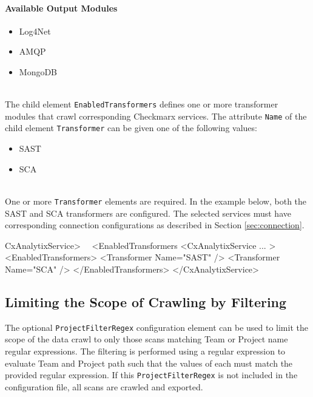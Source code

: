 \paragraph{Available Output Modules}\label{lst:outmodules}
\begin{itemize}
    \item Log4Net
    \item AMQP
    \item MongoDB
\end{itemize}

\noindent\\The child element \texttt{EnabledTransformers} defines one or more transformer modules that crawl corresponding Checkmarx services.  The
attribute \texttt{Name} of the child element \texttt{Transformer} can be given one of the following values:\\

\begin{itemize}
    \item SAST
    \item SCA
\end{itemize}

\noindent\\One or more \texttt{Transformer} elements are required.  In the example below, both the SAST and SCA transformers are configured.
The selected services must have corresponding connection configurations as described in Section \ref{sec:connection}.

\begin{xml}{CxAnalytixService> \ \faArrowLeft \ <EnabledTransformers}{}{}
<CxAnalytixService ... >
    <EnabledTransformers>
        <Transformer Name="SAST" />
        <Transformer Name="SCA" />
    </EnabledTransformers>
</CxAnalytixService>
\end{xml}

\subsection{Limiting the Scope of Crawling by Filtering}

The optional \texttt{ProjectFilterRegex} configuration element can be used to limit the scope of the data crawl to only those scans matching Team or Project
name regular expressions.  The filtering is performed using a regular expression to evaluate Team and Project path such that the values of each must
match the provided regular expression.  If this \texttt{ProjectFilterRegex} is not included in the configuration file, all scans are crawled and exported.

